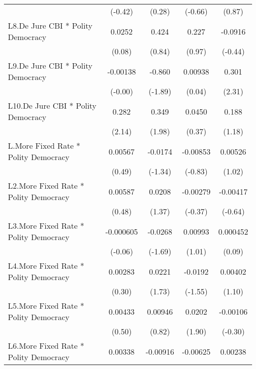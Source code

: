 {\begin{longtable}{l*{4}{c}}
                &  (-0.42)         &   (0.28)         &  (-0.66)         &   (0.87)         \\
[1em]
L8.De Jure CBI * Polity Democracy&   0.0252         &    0.424         &    0.227         &  -0.0916         \\
                &   (0.08)         &   (0.84)         &   (0.97)         &  (-0.44)         \\
[1em]
L9.De Jure CBI * Polity Democracy& -0.00138         &   -0.860         &  0.00938         &    0.301\sym{*}  \\
                &  (-0.00)         &  (-1.89)         &   (0.04)         &   (2.31)         \\
[1em]
L10.De Jure CBI * Polity Democracy&    0.282\sym{*}  &    0.349\sym{*}  &   0.0450         &    0.188         \\
                &   (2.14)         &   (1.98)         &   (0.37)         &   (1.18)         \\
[1em]
L.More Fixed Rate * Polity Democracy&  0.00567         &  -0.0174         & -0.00853         &  0.00526         \\
                &   (0.49)         &  (-1.34)         &  (-0.83)         &   (1.02)         \\
[1em]
L2.More Fixed Rate * Polity Democracy&  0.00587         &   0.0208         & -0.00279         & -0.00417         \\
                &   (0.48)         &   (1.37)         &  (-0.37)         &  (-0.64)         \\
[1em]
L3.More Fixed Rate * Polity Democracy&-0.000605         &  -0.0268         &  0.00993         & 0.000452         \\
                &  (-0.06)         &  (-1.69)         &   (1.01)         &   (0.09)         \\
[1em]
L4.More Fixed Rate * Polity Democracy&  0.00283         &   0.0221         &  -0.0192         &  0.00402         \\
                &   (0.30)         &   (1.73)         &  (-1.55)         &   (1.10)         \\
[1em]
L5.More Fixed Rate * Polity Democracy&  0.00433         &  0.00946         &   0.0202         & -0.00106         \\
                &   (0.50)         &   (0.82)         &   (1.90)         &  (-0.30)         \\
[1em]
L6.More Fixed Rate * Polity Democracy&  0.00338         & -0.00916         & -0.00625         &  0.00238         \\

\end{longtable}}

